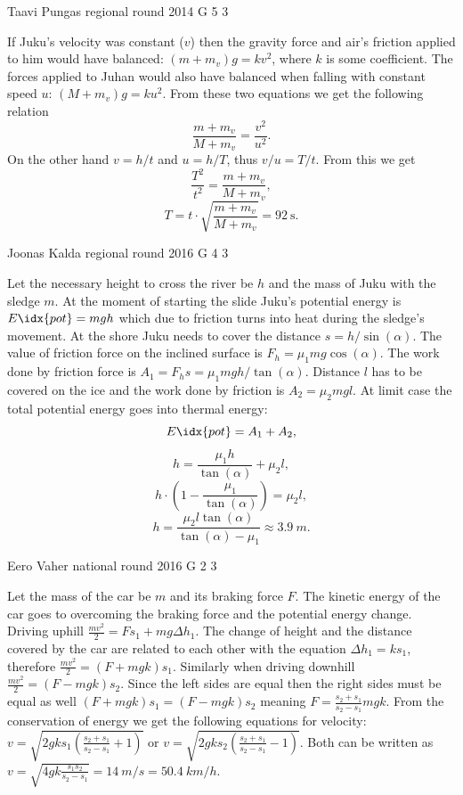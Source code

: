 \documentclass[11pt]{article}
\begin{document}
{Taavi Pungas} %
{regional round} %
{2014} %
{G 5} %
{3} %
{

\ifEngSolution
If Juku’s velocity was constant ($v$) then the gravity force and air’s friction applied to him would have balanced: $(m+m_v)g=kv^2$, where $k$ is some coefficient. The forces applied to Juhan would also have balanced when falling with constant speed $u$: $(M+m_v)g=ku^2$. From these two equations we get the following relation
\[\frac{m+m_v}{M+m_v}=\frac{v^2}{u^2}.\]
On the other hand $v=h/t$ and $u=h/T$, thus $v/u=T/t$. From this we get
\[\frac{T^2}{t^2}=\frac{m+m_v}{M+m_v},\]
\[T=t \cdot \sqrt{\frac{m+m_v}{M+m_v}}=\SI{92}{\s}.\]
\fi
}

{Joonas Kalda} %
{regional round} %
{2016} %
{G 4} %
{3} %
{

\ifEngSolution
Let the necessary height to cross the river be $h$ and the mass of Juku with the sledge $m$. At the moment of starting the slide Juku’s potential energy is $E\idx{pot} = mgh$ which due to friction turns into heat during the sledge’s movement. At the shore Juku needs to cover the distance $s = h/\sin(\alpha)$. The value of friction force on the inclined surface is $F_h=\mu_1 mg \cos(\alpha)$. The work done by friction force is $A_1 = F_h s = {\mu_1}mgh/\tan(\alpha)$. Distance $l$ has to be covered on the ice and the work done by friction is $A_2 = {\mu_2}mgl$. At limit case the total potential energy goes into thermal energy: 
$$E\idx{pot} = A_1 + A_2,$$
$$h =\frac{\mu_1 h}{\tan(\alpha)} + {\mu_2}   l, $$
$$h \cdot \left(1 - \frac{\mu_1}{\tan(\alpha)}\right) = {\mu_2}  l,$$
$$h = \frac{\mu_2 l \tan(\alpha)}{\tan(\alpha) - {\mu_1}} \approx \SI{3.9}{m}.$$
\fi
}

{Eero Vaher} %
{national round} %
{2016} %
{G 2} %
{3} %
{

\ifEngSolution
Let the mass of the car be $m$ and its braking force $F$. The kinetic energy of the car goes to overcoming the braking force and the potential energy change. Driving uphill $\frac{mv^2}{2}=Fs_1+mg\Delta h_1$. The change of height and the distance covered by the car are related to each other with the equation $\Delta h_1=ks_1$, therefore $\frac{mv^2}{2}=\left(F+mgk\right)s_1$. Similarly when driving downhill $\frac{mv^2}{2}=\left(F-mgk\right)s_2$. Since the left sides are equal then the right sides must be equal as well $\left(F+mgk\right)s_1=\left(F-mgk\right)s_2$ meaning $F=\frac{s_2+s_1}{s_2-s_1}mgk$. From the conservation of energy we get the following equations for velocity: $v=\sqrt{2gks_1\left(\frac{s_2+s_1}{s_2-s_1}+1\right)}$ or $v=\sqrt{2gks_2\left(\frac{s_2+s_1}{s_2-s_1}-1\right)}$. Both can be written as $v=\sqrt{4gk\frac{s_1s_2}{s_2-s_1}}=\SI{14}{m \per s}=\SI{50.4}{km \per h}$.
\fi
}
\end{document}
